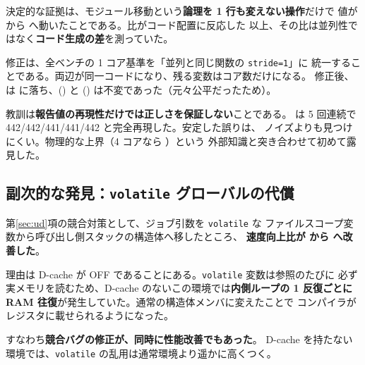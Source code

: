 決定的な証拠は、モジュール移動という\textbf{論理を 1 行も変えない操作}だけで
値が  から  へ動いたことである。比がコード配置に反応した
以上、その比は並列性ではなく\textbf{コード生成の差}を測っていた。

修正は、全ベンチの 1 コア基準を「並列と同じ関数の \texttt{stride=1}」に
統一することである。両辺が同一コードになり、残る変数はコア数だけになる。
修正後、 は  に落ち、() と
() は不変であった（元々公平だったため）。

\noindent
教訓は\textbf{報告値の再現性だけでは正しさを保証しない}ことである。
 は 5 回連続で 442/442/441/441/442 と完全再現した。安定した誤りは、
ノイズよりも見つけにくい。物理的な上界（4 コアなら ）という
外部知識と突き合わせて初めて露見した。

\subsection{副次的な発見：\texttt{volatile} グローバルの代償}
\label{sec:rpi3-volatile}

第\ref{sec:ud}項の競合対策として、ジョブ引数を \texttt{volatile} な
ファイルスコープ変数から呼び出し側スタックの構造体へ移したところ、
\textbf{速度向上比が  から  へ改善した}。

理由は D-cache が OFF であることにある。\texttt{volatile} 変数は参照のたびに
必ず実メモリを読むため、D-cache のないこの環境では\textbf{内側ループの
1 反復ごとに RAM 往復}が発生していた。通常の構造体メンバに変えたことで
コンパイラがレジスタに載せられるようになった。

すなわち\textbf{競合バグの修正が、同時に性能改善でもあった}。
D-cache を持たない環境では、\texttt{volatile} の乱用は通常環境より遥かに高くつく。
